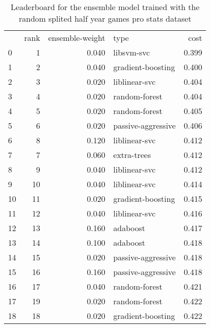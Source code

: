 \begin{table}[]
	\centering
	\begin{tabular}{lrrlr}
		   & rank & ensemble-weight & type               & cost  \\
		0  & 1    & 0.040           & libsvm-svc         & 0.399 \\
		1  & 2    & 0.040           & gradient-boosting  & 0.400 \\
		2  & 3    & 0.020           & liblinear-svc      & 0.404 \\
		3  & 4    & 0.020           & random-forest      & 0.404 \\
		4  & 5    & 0.020           & random-forest      & 0.405 \\
		5  & 6    & 0.020           & passive-aggressive & 0.406 \\
		6  & 8    & 0.120           & liblinear-svc      & 0.412 \\
		7  & 7    & 0.060           & extra-trees        & 0.412 \\
		8  & 9    & 0.040           & liblinear-svc      & 0.412 \\
		9  & 10   & 0.040           & liblinear-svc      & 0.414 \\
		10 & 11   & 0.020           & gradient-boosting  & 0.415 \\
		11 & 12   & 0.040           & liblinear-svc      & 0.416 \\
		12 & 13   & 0.160           & adaboost           & 0.417 \\
		13 & 14   & 0.100           & adaboost           & 0.418 \\
		14 & 15   & 0.020           & passive-aggressive & 0.418 \\
		15 & 16   & 0.160           & passive-aggressive & 0.418 \\
		16 & 17   & 0.040           & random-forest      & 0.421 \\
		17 & 19   & 0.020           & random-forest      & 0.422 \\
		18 & 18   & 0.020           & gradient-boosting  & 0.422 \\
	\end{tabular}

	\caption{Leaderboard for the ensemble model trained with the random splited half year games pro stats dataset}
	\label{tab:lb-all-games-pro-only-randsplit}
\end{table}

